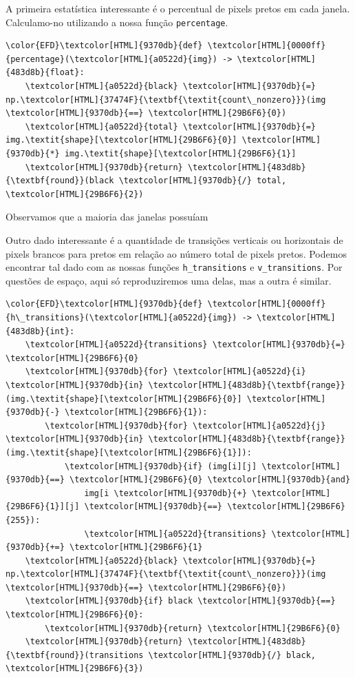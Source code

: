 \documentclass[twocolumn, 10pt]{article}
\begin{document}
A primeira estatística interessante é o percentual de pixels pretos em cada janela.
Calculamo-no utilizando a nossa função \texttt{percentage}.
\begin{Code}
\begin{Verbatim}
\color{EFD}\textcolor[HTML]{9370db}{def} \textcolor[HTML]{0000ff}{percentage}(\textcolor[HTML]{a0522d}{img}) -> \textcolor[HTML]{483d8b}{float}:
    \textcolor[HTML]{a0522d}{black} \textcolor[HTML]{9370db}{=} np.\textcolor[HTML]{37474F}{\textbf{\textit{count\_nonzero}}}(img \textcolor[HTML]{9370db}{==} \textcolor[HTML]{29B6F6}{0})
    \textcolor[HTML]{a0522d}{total} \textcolor[HTML]{9370db}{=} img.\textit{shape}[\textcolor[HTML]{29B6F6}{0}] \textcolor[HTML]{9370db}{*} img.\textit{shape}[\textcolor[HTML]{29B6F6}{1}]
    \textcolor[HTML]{9370db}{return} \textcolor[HTML]{483d8b}{\textbf{round}}(black \textcolor[HTML]{9370db}{/} total, \textcolor[HTML]{29B6F6}{2})
\end{Verbatim}
\end{Code}
Observamos que a maioria das janelas possuíam

Outro dado interessante é a quantidade de transições verticais ou horizontais de pixels brancos para pretos em relação ao número total de pixels pretos.
Podemos encontrar tal dado com as nossas funções \texttt{h\_transitions} e \texttt{v\_transitions}.
Por questões de espaço, aqui só reproduziremos uma delas, mas a outra é similar.

\begin{Code}
\begin{Verbatim}
\color{EFD}\textcolor[HTML]{9370db}{def} \textcolor[HTML]{0000ff}{h\_transitions}(\textcolor[HTML]{a0522d}{img}) -> \textcolor[HTML]{483d8b}{int}:
    \textcolor[HTML]{a0522d}{transitions} \textcolor[HTML]{9370db}{=} \textcolor[HTML]{29B6F6}{0}
    \textcolor[HTML]{9370db}{for} \textcolor[HTML]{a0522d}{i} \textcolor[HTML]{9370db}{in} \textcolor[HTML]{483d8b}{\textbf{range}}(img.\textit{shape}[\textcolor[HTML]{29B6F6}{0}] \textcolor[HTML]{9370db}{-} \textcolor[HTML]{29B6F6}{1}):
        \textcolor[HTML]{9370db}{for} \textcolor[HTML]{a0522d}{j} \textcolor[HTML]{9370db}{in} \textcolor[HTML]{483d8b}{\textbf{range}}(img.\textit{shape}[\textcolor[HTML]{29B6F6}{1}]):
            \textcolor[HTML]{9370db}{if} (img[i][j] \textcolor[HTML]{9370db}{==} \textcolor[HTML]{29B6F6}{0} \textcolor[HTML]{9370db}{and}
                img[i \textcolor[HTML]{9370db}{+} \textcolor[HTML]{29B6F6}{1}][j] \textcolor[HTML]{9370db}{==} \textcolor[HTML]{29B6F6}{255}):
                \textcolor[HTML]{a0522d}{transitions} \textcolor[HTML]{9370db}{+=} \textcolor[HTML]{29B6F6}{1}
    \textcolor[HTML]{a0522d}{black} \textcolor[HTML]{9370db}{=} np.\textcolor[HTML]{37474F}{\textbf{\textit{count\_nonzero}}}(img \textcolor[HTML]{9370db}{==} \textcolor[HTML]{29B6F6}{0})
    \textcolor[HTML]{9370db}{if} black \textcolor[HTML]{9370db}{==} \textcolor[HTML]{29B6F6}{0}:
        \textcolor[HTML]{9370db}{return} \textcolor[HTML]{29B6F6}{0}
    \textcolor[HTML]{9370db}{return} \textcolor[HTML]{483d8b}{\textbf{round}}(transitions \textcolor[HTML]{9370db}{/} black, \textcolor[HTML]{29B6F6}{3})
\end{Verbatim}
\end{Code}
\end{document}
